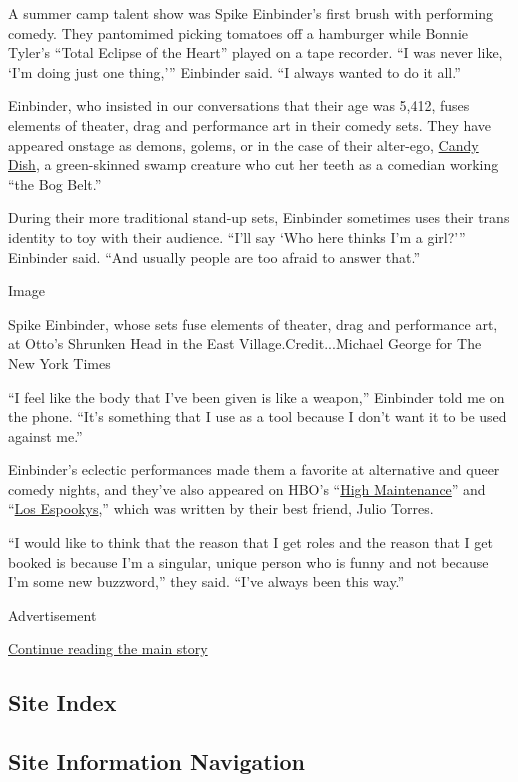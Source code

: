A summer camp talent show was Spike Einbinder's first brush with
performing comedy. They pantomimed picking tomatoes off a hamburger
while Bonnie Tyler's ``Total Eclipse of the Heart'' played on a tape
recorder. ``I was never like, `I'm doing just one thing,''' Einbinder
said. ``I always wanted to do it all.''

Einbinder, who insisted in our conversations that their age was 5,412,
fuses elements of theater, drag and performance art in their comedy
sets. They have appeared onstage as demons, golems, or in the case of
their alter-ego, \href{https://youtu.be/pxg8rkB5qMM}{Candy Dish}, a
green-skinned swamp creature who cut her teeth as a comedian working
``the Bog Belt.''

During their more traditional stand-up sets, Einbinder sometimes uses
their trans identity to toy with their audience. ``I'll say `Who here
thinks I'm a girl?''' Einbinder said. ``And usually people are too
afraid to answer that.''

Image

Spike Einbinder, whose sets fuse elements of theater, drag and
performance art, at Otto's Shrunken Head in the East
Village.Credit...Michael George for The New York Times

``I feel like the body that I've been given is like a weapon,''
Einbinder told me on the phone. ``It's something that I use as a tool
because I don't want it to be used against me.''

Einbinder's eclectic performances made them a favorite at alternative
and queer comedy nights, and they've also appeared on HBO's
``\href{https://www.hbo.com/high-maintenance/season-3/5-payday}{High
Maintenance}'' and ``\href{https://www.hbo.com/los-espookys}{Los
Espookys},'' which was written by their best friend, Julio Torres.

``I would like to think that the reason that I get roles and the reason
that I get booked is because I'm a singular, unique person who is funny
and not because I'm some new buzzword,'' they said. ``I've always been
this way.''

Advertisement

\protect\hyperlink{after-bottom}{Continue reading the main story}

\hypertarget{site-index}{%
\subsection{Site Index}\label{site-index}}

\hypertarget{site-information-navigation}{%
\subsection{Site Information
Navigation}\label{site-information-navigation}}

